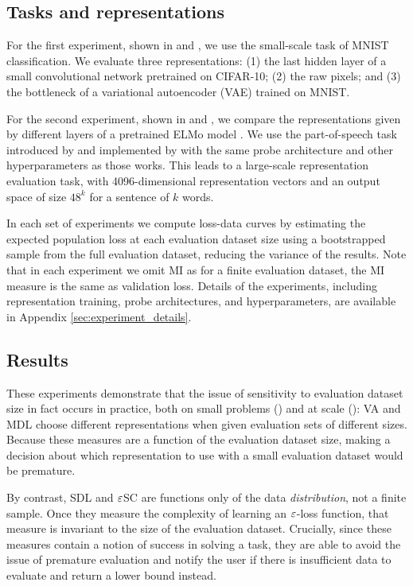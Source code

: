 \subsection{Tasks and representations}
For the first experiment, shown in  and , we use the small-scale task of MNIST classification.
We evaluate three representations: (1) the last hidden layer of a small convolutional network pretrained on CIFAR-10; (2) the raw pixels; and (3) the bottleneck of a variational autoencoder (VAE) \citep{Kingma2014AutoEncodingVB,Rezende2014StochasticBA} trained on MNIST.


For the second experiment, shown in  and , we compare the representations given by different layers of a pretrained ELMo model \citep{Peters2018DeepCW}.
We use the part-of-speech task introduced by \citet{Hewitt2019DesigningProbes} and implemented by \citet{Voita2020InformationTheoreticPW} with the same probe architecture and other hyperparameters as those works.
This leads to a large-scale representation evaluation task, with 4096-dimensional representation vectors and an output space of size $48^k$ for a sentence of $k$ words.

In each set of experiments we compute loss-data curves by estimating the expected population loss at each evaluation dataset size using a bootstrapped sample from the full evaluation dataset, reducing the variance of the results.
Note that in each experiment we omit MI as for a finite evaluation dataset, the MI measure is the same as validation loss.
Details of the experiments, including representation training, probe architectures, and hyperparameters, are available in Appendix \ref{sec:experiment_details}.

\subsection{Results}
These experiments demonstrate that the issue of sensitivity to evaluation dataset size in fact occurs in practice, both on small problems () and at scale (): VA and MDL choose different representations when given evaluation sets of different sizes.
Because these measures are a function of the evaluation dataset size, making a decision about which representation to use with a small evaluation dataset would be premature.

By contrast, SDL and $\varepsilon$SC are functions only of the data \emph{distribution}, not a finite sample.
Once they measure the complexity of learning an $\varepsilon$-loss function, that measure is invariant to the size of the evaluation dataset.
Crucially, since these measures contain a notion of success in  solving a task, they are able to avoid the issue of premature evaluation and notify the user if there is insufficient data to evaluate and return a lower bound instead.

